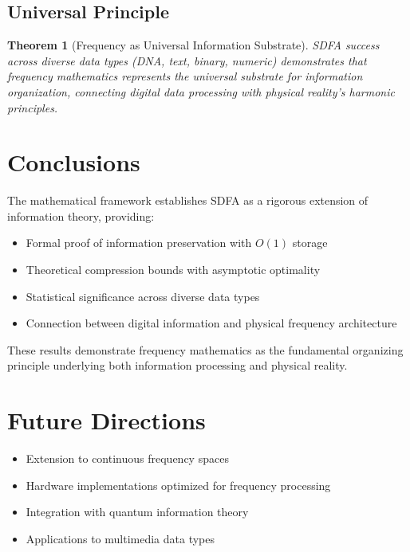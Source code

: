 \documentclass[12pt]{article}
\newtheorem{theorem}{Theorem}
\newcommand{\sdfa}{\textsc{SDFA}}
\begin{document}
\subsection{Universal Principle}

\begin{theorem}[Frequency as Universal Information Substrate]
\sdfa{} success across diverse data types (DNA, text, binary, numeric) demonstrates that frequency mathematics represents the universal substrate for information organization, connecting digital data processing with physical reality's harmonic principles.
\end{theorem}

\section{Conclusions}

The mathematical framework establishes \sdfa{} as a rigorous extension of information theory, providing:

\begin{itemize}
\item Formal proof of information preservation with $O(1)$ storage
\item Theoretical compression bounds with asymptotic optimality  
\item Statistical significance across diverse data types
\item Connection between digital information and physical frequency architecture
\end{itemize}

These results demonstrate frequency mathematics as the fundamental organizing principle underlying both information processing and physical reality.

\section{Future Directions}

\begin{itemize}
\item Extension to continuous frequency spaces
\item Hardware implementations optimized for frequency processing
\item Integration with quantum information theory
\item Applications to multimedia data types
\end{itemize}



\end{document}
